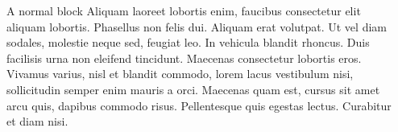 \documentclass[final]{beamer}
\newlength{\sepwidth}
\newlength{\colwidth}
\newcommand{\separatorcolumn}{\begin{column}{\sepwidth}\end{column}}
\begin{document}
\begin{frame}[t]
\begin{columns}[t]
\begin{column}{\colwidth}
\begin{block}{A normal block}
Aliquam laoreet lobortis enim, faucibus consectetur elit aliquam lobortis. Phasellus non felis dui. Aliquam erat volutpat. Ut vel diam sodales, molestie neque sed, feugiat leo. In vehicula blandit rhoncus. Duis facilisis urna non eleifend tincidunt. Maecenas consectetur lobortis eros. Vivamus varius, nisl et blandit commodo, lorem lacus vestibulum nisi, sollicitudin semper enim mauris a orci. Maecenas quam est, cursus sit amet arcu quis, dapibus commodo risus. Pellentesque quis egestas lectus. Curabitur et diam nisi. 


  \end{block}


\vspace{0pt}

\end{column}

\separatorcolumn
\end{columns}
\end{frame}
\end{document}
